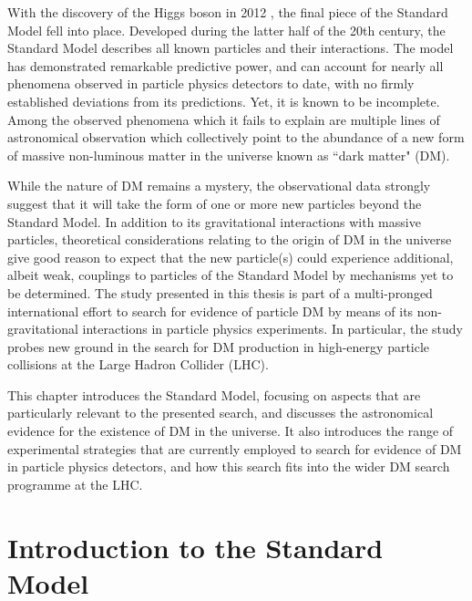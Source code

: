 \label{chapter:introduction}

With the discovery of the Higgs boson in 2012 \cite{atlas_higgs_2012, cms_higgs_2012}, the final piece of the Standard Model fell into place. Developed during the latter half of the 20th century, the Standard Model describes all known particles and their interactions. The model has demonstrated remarkable predictive power, and can account for nearly all phenomena observed in particle physics detectors to date, with no firmly established deviations from its predictions. Yet, it is known to be incomplete. Among the observed phenomena which it fails to explain \cite{einstein_1920, neutrino_oscillations_1998, Canetti_2012} are multiple lines of astronomical observation which collectively point to the abundance of a new form of massive non-luminous matter in the universe known as ``dark matter" (DM). 

While the nature of DM remains a mystery, the observational data strongly suggest that it will take the form of one or more new particles beyond the Standard Model. In addition to its gravitational interactions with massive particles, theoretical considerations relating to the origin of DM in the universe give good reason to expect that the new particle(s) could experience additional, albeit weak, couplings to particles of the Standard Model by mechanisms yet to be determined. The study presented in this thesis is part of a multi-pronged international effort to search for evidence of particle DM by means of its non-gravitational interactions in particle physics experiments. In particular, the study probes new ground in the search for DM production in high-energy particle collisions at the Large Hadron Collider (LHC). 

This chapter introduces the Standard Model, focusing on aspects that are particularly relevant to the presented search, and discusses the astronomical evidence for the existence of DM in the universe. It also introduces the range of experimental strategies that are currently employed to search for evidence of DM in particle physics detectors, and how this search fits into the wider DM search programme at the LHC. 

\section{Introduction to the Standard Model}

